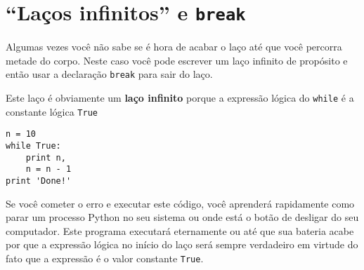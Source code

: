 
\section{``Laços infinitos'' e {\tt break}}


Algumas vezes você não sabe se é hora de acabar o laço até que você percorra
metade do corpo. Neste caso você pode escrever um laço infinito de propósito
e então usar a declaração {\tt break} para sair do laço.


Este laço é obviamente um {\bf laço infinito} porque a expressão lógica do
{\tt while} é a constante lógica {\tt True}

\beforeverb
\begin{verbatim}
n = 10
while True:
    print n, 
    n = n - 1
print 'Done!'
\end{verbatim}
\afterverb
%

%
Se você cometer o erro e executar este código, você aprenderá rapidamente como
parar um processo Python no seu sistema ou onde está o botão de desligar do
seu computador. Este programa executará eternamente ou até que sua bateria
acabe por que a expressão lógica no início do laço será sempre verdadeiro
em virtude do fato que a expressão é o valor constante {\tt True}.


